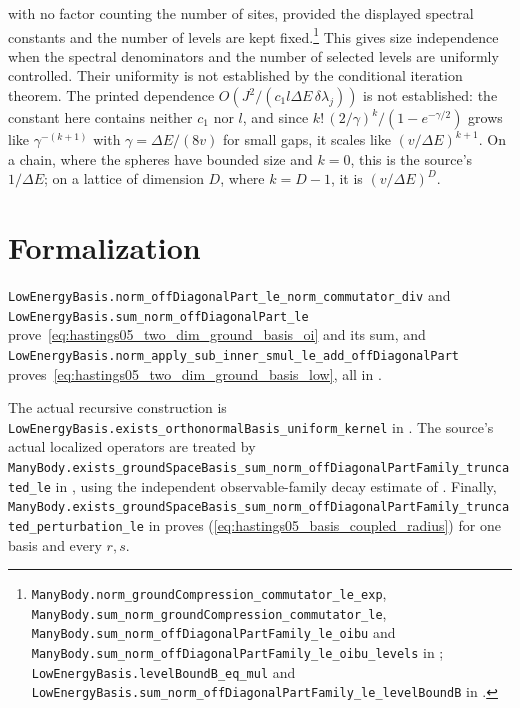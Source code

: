 \documentclass{article}
\providecommand{\leanid}[1]{\nolinkurl{#1}}
\begin{document}
with no factor counting the number of sites, provided the displayed spectral
constants and the number of levels are kept fixed.\footnote{\leanid{ManyBody.norm_groundCompression_commutator_le_exp},
    \leanid{ManyBody.sum_norm_groundCompression_commutator_le},
    \leanid{ManyBody.sum_norm_offDiagonalPartFamily_le_oibu} and
    \leanid{ManyBody.sum_norm_offDiagonalPartFamily_le_oibu_levels} in
    ;
    \leanid{LowEnergyBasis.levelBoundB_eq_mul} and
    \leanid{LowEnergyBasis.sum_norm_offDiagonalPartFamily_le_levelBoundB} in
    .}
This gives size independence when the spectral denominators and the number of
selected levels are uniformly controlled. Their uniformity is not established by
the conditional iteration theorem. The printed dependence $O(J^2/(c_1l\Delta E\,\delta\lambda_j))$ is not established:
the constant here contains neither $c_1$ nor $l$, and since
$k!\,(2/\gamma)^k/(1-e^{-\gamma/2})$ grows like $\gamma^{-(k+1)}$ with
$\gamma=\Delta E/(8v)$ for small gaps, it scales like $(v/\Delta E)^{k+1}$.
On a chain, where the spheres have bounded size and $k=0$, this is the source's
$1/\Delta E$; on a lattice of dimension $D$, where $k=D-1$, it is
$(v/\Delta E)^D$.

\section{Formalization}

\leanid{LowEnergyBasis.norm_offDiagonalPart_le_norm_commutator_div} and
\leanid{LowEnergyBasis.sum_norm_offDiagonalPart_le}
prove~\eqref{eq:hastings05_two_dim_ground_basis_oi} and its sum, and
\leanid{LowEnergyBasis.norm_apply_sub_inner_smul_le_add_offDiagonalPart}
proves~\eqref{eq:hastings05_two_dim_ground_basis_low}, all in
.

The actual recursive construction is
\leanid{LowEnergyBasis.exists_orthonormalBasis_uniform_kernel} in
. The source's actual localized
operators are treated by
\leanid{ManyBody.exists_groundSpaceBasis_sum_norm_offDiagonalPartFamily_truncated_le}
in , using the independent
observable-family decay estimate of .
Finally,
\leanid{ManyBody.exists_groundSpaceBasis_sum_norm_offDiagonalPartFamily_truncated_perturbation_le}
in  proves
(\ref{eq:hastings05_basis_coupled_radius}) for one basis and every $r,s$.



\end{document}
